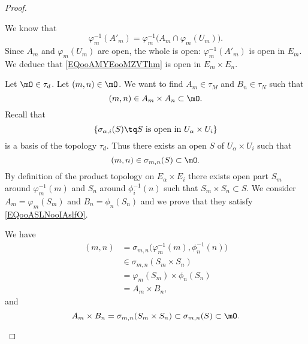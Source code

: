 \begin{proof}
\begin{subproof}
		We know that
		\begin{equation}
			\varphi_m^{-1}(A'_m)=\varphi_m^{-1}\big(A_m\cap\varphi_m(U_m)\big).
		\end{equation}
		Since \( A_m\) and \( \varphi_m(U_m)\) are open, the whole is open: \( \varphi_m^{-1}(A'_m)\) is open in \( E_m\). We deduce that \eqref{EQooAMYEooMZVThm} is open in \( E_m\times E_n\).

		Let \( \mO\in\tau_d\). Let \( (m,n)\in\mO\). We want to find \( A_m\in\tau_M\) and \( B_n\in \tau_N\) such that
		\begin{equation}		\label{EQooASLNooIAslfO}
			(m,n)\in A_m\times A_n\subset \mO.
		\end{equation}
		Recall that
		\begin{equation}
			\{ \sigma_{\alpha,i}(S)\tq S\text{ is open in }U_{\alpha}\times U_i \}
		\end{equation}
		is a basis of the topology \( \tau_d\). Thus there exists an open \( S\) of \( U_{\alpha}\times U_i\) such that
		\begin{equation}
			(m,n)\in\sigma_{m,n}(S)\subset \mO.
		\end{equation}
		By definition of the product topology on \( E_{\alpha}\times E_i\) there exists open part \( S_m\) around \( \varphi_m^{-1}(m)\) and \( S_n\) around \( \phi_i^{-1}(n)\) such that \( S_m\times S_n\subset S\). We consider \( A_m=\varphi_m(S_m)\) and \( B_n=\phi_n(S_n)\) and we prove that they satisfy \eqref{EQooASLNooIAslfO}.

		We have
		\begin{subequations}
			\begin{align}
				(m,n) & =\sigma_{m,n}\big( \varphi_m^{-1}(m), \phi_n^{-1}(n) \big) \\
				      & \in \sigma_{m,n}(S_m\times S_n)                            \\
				      & =\varphi_m(S_m)\times \phi_n(S_n)                          \\
				      & =A_m\times B_n,
			\end{align}
		\end{subequations}
		and
		\begin{equation}
			A_m\times B_n=\sigma_{m,n}(S_m\times S_n)\subset \sigma_{m,n}(S)\subset\mO.
		\end{equation}
	\end{subproof}
\end{proof}

